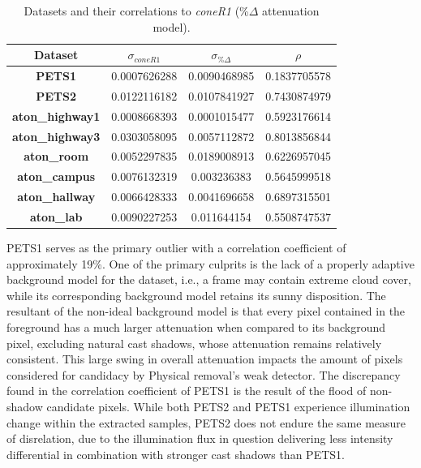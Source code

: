 \documentclass[12pt]{report}
\begin{document}
\begin{table}
\begin{tabular}{ |c|c|c|c| }
	\hline
	\textbf{Dataset} & \textbf{$\sigma_{coneR1}$} & \textbf{$\sigma_{\%\Delta}$} & \textbf{$\rho$} \\
	\hline
	\hline
	\textbf{PETS1} & 0.0007626288 & 0.0090468985 & 0.1837705578 \\
	\hline
	\textbf{PETS2} & 0.0122116182 & 0.0107841927 & 0.7430874979 \\
	\hline
	\textbf{aton\_highway1} & 0.0008668393 & 0.0001015477 & 0.5923176614 \\
	\hline
	\textbf{aton\_highway3} & 0.0303058095 & 0.0057112872 &  0.8013856844 \\
	\hline
	\textbf{aton\_room} & 0.0052297835 & 0.0189008913 &  0.6226957045 \\
	\hline
	\textbf{aton\_campus} & 0.0076132319 & 0.003236383 &  0.5645999518 \\
	\hline
	\textbf{aton\_hallway} & 0.0066428333 & 0.0041696658 &  0.6897315501 \\
	\hline
	\textbf{aton\_lab} & 0.0090227253 & 0.011644154 &  0.5508747537 \\
	\hline
\end{tabular}
\caption{Datasets and their correlations to \textit{coneR1} (\%$\Delta$ attenuation model).}
\label{table:corr_rgb}
\end{table}

PETS1 serves as the primary outlier with a correlation coefficient of approximately 19\%. One of the primary culprits is the lack of a properly adaptive background model for the dataset, i.e., a frame may contain extreme cloud cover, while its corresponding background model retains its sunny disposition. The resultant of the non-ideal background model is that every pixel contained in the foreground has a much larger attenuation when compared to its background pixel, excluding natural cast shadows, whose attenuation remains relatively consistent. This large swing in overall attenuation impacts the amount of pixels considered for candidacy by Physical removal's weak detector. The discrepancy found in the correlation coefficient of PETS1 is the result of the flood of non-shadow candidate pixels. While both PETS2 and PETS1 experience illumination change within the extracted samples, PETS2 does not endure the same measure of disrelation, due to the illumination flux in question delivering less intensity differential in combination with stronger cast shadows than PETS1. 
\end{document}
